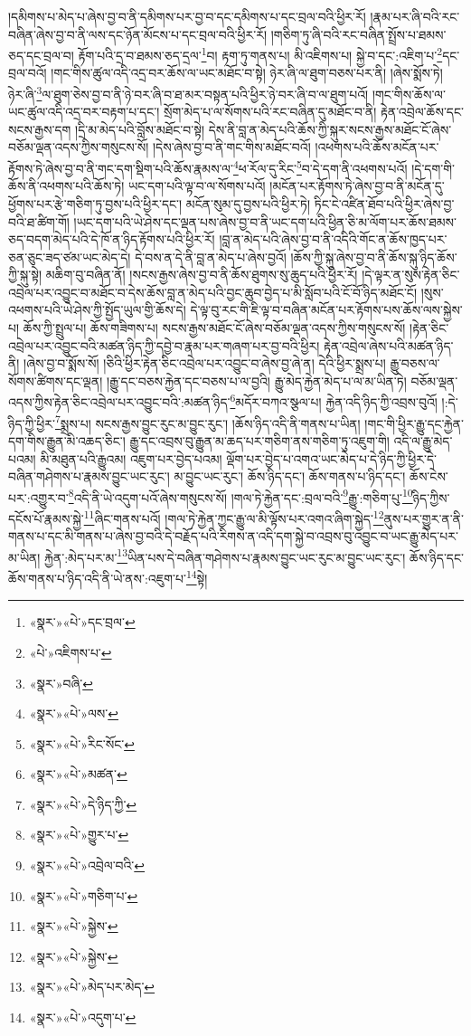 །དམིགས་པ་མེད་པ་ཞེས་བྱ་བ་ནི་དམིགས་པར་བྱ་བ་དང་དམིགས་པ་དང་བྲལ་བའི་ཕྱིར་རོ། །རྣམ་པར་ཞི་བའི་རང་བཞིན་ཞེས་བྱ་བ་ནི་ལས་དང་ཉོན་མོངས་པ་དང་བྲལ་བའི་ཕྱིར་རོ། །གཅིག་ཏུ་ཞི་བའི་རང་བཞིན་སྤྲོས་པ་ཐམས་ཅད་དང་བྲལ་བ། རྟོག་པའི་དྲ་བ་ཐམས་ཅད་དྲལ་\footnote{«སྣར་»«པེ་»དང་བྲལ་}བ། རྟག་ཏུ་གནས་པ། མི་འཇིགས་པ། སྐྱེ་བ་དང་:འཇིག་པ་\footnote{«པེ་»འཇིགས་པ་}དང་བྲལ་བའོ། །གང་གིས་ཚུལ་འདི་འདྲ་བར་ཆོས་ལ་ཡང་མཐོང་བ་སྟེ། ཉེར་ཞི་ལ་ཐུག་བཅས་པར་ནི། །ཞེས་སྨོས་ཏེ། ཉེར་ཞི་\footnote{«སྣར་»བཞི་}ལ་ཐུག་ཅེས་བྱ་བ་ནི་ཉེ་བར་ཞི་བ་ཐ་མར་བསྟན་པའི་ཕྱིར་ཉེ་བར་ཞི་བ་ལ་ཐུག་པའོ། །གང་གིས་ཆོས་ལ་ཡང་ཚུལ་འདི་འདྲ་བར་བརྟག་པ་དང་། སྲོག་མེད་པ་ལ་སོགས་པའི་རང་བཞིན་དུ་མཐོང་བ་ནི། རྟེན་འབྲེལ་ཆོས་དང་སངས་རྒྱས་དག །དྲི་མ་མེད་པའི་བློས་མཐོང་བ་སྟེ། དེས་ནི་བླ་ན་མེད་པའི་ཆོས་ཀྱི་སྐུར་སངས་རྒྱས་མཐོང་ངོ་ཞེས་བཅོམ་ལྡན་འདས་ཀྱིས་གསུངས་སོ། །དེས་ཞེས་བྱ་བ་ནི་གང་གིས་མཐོང་བའོ། །འཕགས་པའི་ཆོས་མངོན་པར་རྟོགས་ཏེ་ཞེས་བྱ་བ་ནི་གང་དག་སྡིག་པའི་ཆོས་རྣམས་ལ་\footnote{«སྣར་»«པེ་»ལས་}ཕ་རོལ་དུ་རིང་\footnote{«སྣར་»«པེ་»རིང་སོང་}བ་དེ་དག་ནི་འཕགས་པའོ། །དེ་དག་གི་ཆོས་ནི་འཕགས་པའི་ཆོས་ཏེ། ཡང་དག་པའི་ལྟ་བ་ལ་སོགས་པའོ། །མངོན་པར་རྟོགས་ཏེ་ཞེས་བྱ་བ་ནི་མངོན་དུ་ཕྱོགས་པར་རྩེ་གཅིག་ཏུ་བྱས་པའི་ཕྱིར་དང་། མངོན་སུམ་དུ་བྱས་པའི་ཕྱིར་ཏེ། ཏིང་ངེ་འཛིན་ཐོབ་པའི་ཕྱིར་ཞེས་བྱ་བའི་ཐ་ཚིག་གོ། །ཡང་དག་པའི་ཡེ་ཤེས་དང་ལྡན་པས་ཞེས་བྱ་བ་ནི་ཡང་དག་པའི་ཕྱིན་ཅི་མ་ལོག་པར་ཆོས་ཐམས་ཅད་བདག་མེད་པའི་དེ་ཁོ་ན་ཉིད་རྟོགས་པའི་ཕྱིར་རོ། །བླ་ན་མེད་པའི་ཞེས་བྱ་བ་ནི་འདིའི་གོང་ན་ཆོས་ཁྱད་པར་ཅན་ཅུང་ཟད་ཙམ་ཡང་མེད་དེ། དེ་བས་ན་དེ་ནི་བླ་ན་མེད་པ་ཞེས་བྱའོ། །ཆོས་ཀྱི་སྐུ་ཞེས་བྱ་བ་ནི་ཆོས་སྐུ་ཉིད་ཆོས་ཀྱི་སྐུ་སྟེ། མཆིག་བུ་བཞིན་ནོ། །སངས་རྒྱས་ཞེས་བྱ་བ་ནི་ཆོས་ཐུགས་སུ་ཆུད་པའི་ཕྱིར་རོ། །དེ་ལྟར་ན་སུས་རྟེན་ཅིང་འབྲེལ་པར་འབྱུང་བ་མཐོང་བ་དེས་ཆོས་བླ་ན་མེད་པའི་བྱང་ཆུབ་བྱེད་པ་མི་སློབ་པའི་ངོ་བོ་ཉིད་མཐོང་ངོ། །སུས་འཕགས་པའི་ཡེ་ཤེས་ཀྱི་སྤྱོད་ཡུལ་གྱི་ཆོས་དེ། དེ་ལྟ་བུ་རང་གི་ཇི་ལྟ་བ་བཞིན་མངོན་པར་རྟོགས་པས་ཆོས་ལས་སྐྱེས་པ། ཆོས་ཀྱི་སྤྲུལ་པ། ཆོས་གཟིགས་པ། སངས་རྒྱས་མཐོང་ངོ་ཞེས་བཅོམ་ལྡན་འདས་ཀྱིས་གསུངས་སོ། །རྟེན་ཅིང་འབྲེལ་པར་འབྱུང་བའི་མཚན་ཉིད་ཀྱི་དབྱེ་བ་རྣམ་པར་གཞག་པར་བྱ་བའི་ཕྱིར། རྟེན་འབྲེལ་ཞེས་པའི་མཚན་ཉིད་ནི། །ཞེས་བྱ་བ་སྨོས་སོ། །ཅིའི་ཕྱིར་རྟེན་ཅིང་འབྲེལ་པར་འབྱུང་བ་ཞེས་བྱ་ཞེ་ན། དེའི་ཕྱིར་སྨྲས་པ། རྒྱུ་བཅས་ལ་སོགས་ཚིགས་དང་ལྡན། །རྒྱུ་དང་བཅས་རྐྱེན་དང་བཅས་པ་ལ་བྱའི། རྒྱུ་མེད་རྐྱེན་མེད་པ་ལ་མ་ཡིན་ཏེ། བཅོམ་ལྡན་འདས་ཀྱིས་རྟེན་ཅིང་འབྲེལ་པར་འབྱུང་བའི་:མཚན་ཉིད་\footnote{«སྣར་»«པེ་»མཚན་}མདོར་བཀའ་སྩལ་པ། རྐྱེན་འདི་ཉིད་ཀྱི་འབྲས་བུའོ། །:དེ་ཉིད་ཀྱི་ཕྱིར་\footnote{«སྣར་»«པེ་»དེ་ཉིད་ཀྱི་}སྨྲས་པ། སངས་རྒྱས་བྱུང་རུང་མ་བྱུང་རུང་། །ཆོས་ཉིད་འདི་ནི་གནས་པ་ཡིན། །གང་གི་ཕྱིར་རྒྱུ་དང་རྐྱེན་དག་གིས་རྒྱུན་མི་འཆད་ཅིང་། རྒྱུ་དང་འབྲས་བུ་རྒྱུན་མ་ཆད་པར་གཅིག་ནས་གཅིག་ཏུ་འཇུག་གི། འདི་ལ་རྒྱུ་མེད་པའམ། མི་མཐུན་པའི་རྒྱུའམ། འཇུག་པར་བྱེད་པའམ། ལྡོག་པར་བྱེད་པ་འགའ་ཡང་མེད་པ་དེ་ཉིད་ཀྱི་ཕྱིར་དེ་བཞིན་གཤེགས་པ་རྣམས་བྱུང་ཡང་རུང་། མ་བྱུང་ཡང་རུང་། ཆོས་ཉིད་དང་། ཆོས་གནས་པ་ཉིད་དང་། ཆོས་ངེས་པར་:འགྱུར་བ་\footnote{«སྣར་»«པེ་»གྱུར་པ་}འདི་ནི་ཡེ་འདུག་པའོ་ཞེས་གསུངས་སོ། །གལ་ཏེ་རྐྱེན་དང་:བྲལ་བའི་\footnote{«སྣར་»«པེ་»འབྲེལ་བའི་}རྒྱུ་:གཅིག་པུ་\footnote{«སྣར་»«པེ་»གཅིག་པ་}ཉིད་ཀྱིས་དངོས་པོ་རྣམས་སྐྱེ་\footnote{«སྣར་»«པེ་»སྐྱེས་}ཞིང་གནས་པའོ། །གལ་ཏེ་རྐྱེན་ཀྱང་རྒྱུ་ལ་མི་ལྟོས་པར་འགའ་ཞིག་སྐྱེད་\footnote{«སྣར་»«པེ་»སྐྱེས་}ནུས་པར་གྱུར་ན་ནི་གནས་པ་དང་མི་གནས་པ་ཞེས་བྱ་བའི་དེ་བརྗོད་པའི་རིགས་ན་འདི་དག་སྐྱེ་བ་འབྲས་བུ་འབྱུང་བ་ཡང་རྒྱུ་མེད་པར་མ་ཡིན། རྐྱེན་:མེད་པར་མ་\footnote{«སྣར་»«པེ་»མེད་པར་མེད་}ཡིན་པས་དེ་བཞིན་གཤེགས་པ་རྣམས་བྱུང་ཡང་རུང་མ་བྱུང་ཡང་རུང་། ཆོས་ཉིད་དང་ཆོས་གནས་པ་ཉིད་འདི་ནི་ཡེ་ནས་:འཇུག་པ་\footnote{«སྣར་»«པེ་»འདུག་པ་}སྟེ། 